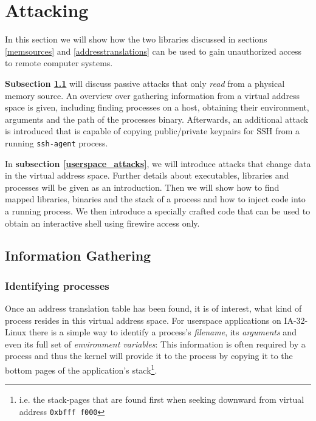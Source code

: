 %
%

\section{Attacking}

\label{attacks}

In this section we will show how the two libraries discussed in sections
\ref{memsources} and \ref{addresstranslations} can be used to gain unauthorized
access to remote computer systems.

\textbf{Subsection \ref{information_gathering}} will discuss passive attacks
that only \emph{read} from a physical memory source. An overview over gathering
information from a virtual address space is given, including finding processes
on a host, obtaining their environment, arguments and the path of the processes
binary.  Afterwards, an additional attack is introduced that is capable of
copying public/private keypairs for SSH from a running \texttt{ssh-agent}
process.

In \textbf{subsection \ref{userspace_attacks}}, we will introduce attacks that
change data in the virtual address space. Further details about executables,
libraries and processes will be given as an introduction. Then we will show how
to find mapped libraries, binaries and the stack of a process and how to inject
code into a running process. We then introduce a specially crafted code that can
be used to obtain an interactive shell using firewire access only.

\subsection{Information Gathering}

\label{information_gathering}

\subsubsection{Identifying processes}

\label{identifying_processes}  Once an address translation table has been found,
it is of interest, what kind of process resides in this virtual address space.
For userspace applications on IA-32-Linux there is a simple way to identify a
process's \emph{filename}, its \emph{arguments} and even its full set of
\emph{environment variables}: This information is often required by a process
and thus the kernel will provide it to the process by copying it to the bottom
pages of the application's stack\footnote{i.e\@. the stack-pages that are found
first when seeking downward from virtual address \texttt{0xbfff~f000}}.


